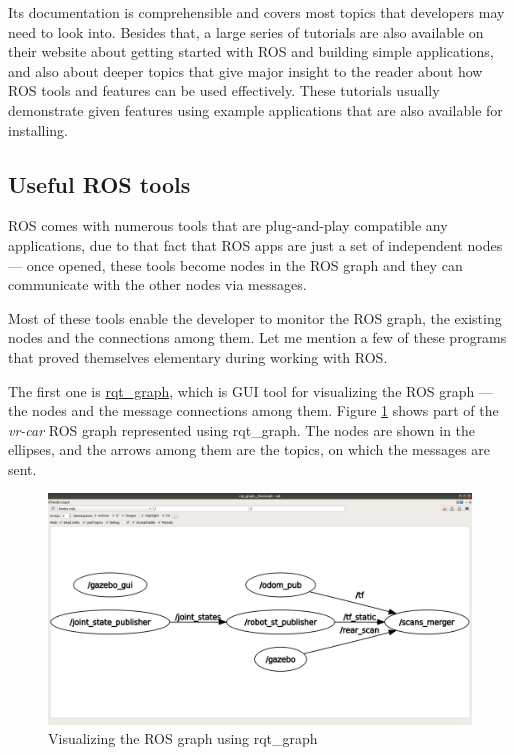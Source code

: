 Its documentation is comprehensible and covers most topics that developers may need to look into. Besides that, a large series of tutorials are also available on their website about getting started with ROS and building simple applications, and also about deeper topics that give major insight to the reader about how ROS tools and features can be used effectively. These tutorials usually demonstrate given features using example applications that are also available for installing.

\subsection{Useful ROS tools}
ROS comes with numerous tools that are plug-and-play compatible any applications, due to that fact that ROS apps are just a set of independent nodes --- once opened, these tools become nodes in the ROS graph and they can communicate with the other nodes via messages.

Most of these tools enable the developer to monitor the ROS graph, the existing nodes and the connections among them. Let me mention a few of these programs that proved themselves elementary during working with ROS.

The first one is \href{http://wiki.ros.org/rqt_graph}{rqt\_graph}, which is GUI tool for visualizing the ROS graph --- the nodes and the message connections among them. Figure \ref{rqt_graph} shows part of the \textit{vr-car} ROS graph represented using rqt\_graph. The nodes are shown in the ellipses, and the arrows among them are the topics, on which the messages are sent.

\begin{figure}[!ht]
	\centering
	\includegraphics[width=\textwidth]{figures/raw/rqt_graph.png}
	\caption{Visualizing the ROS graph using rqt\_graph}
	\label{rqt_graph}
\end{figure}

